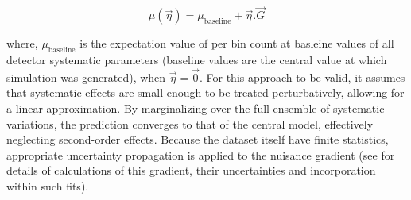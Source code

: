 \begin{equation}\label{eq:gradient}
    \mu(\vec{\eta})  = \mu_{\mathrm{baseline}} + \vec{\eta}.\vec{G}
\end{equation}

where, $\mu_{\mathrm{baseline}}$ is the expectation value of per bin count at basleine values of all detector systematic parameters (baseline values are the central value at which simulation was generated), when $\vec{\eta}=\vec{0}$. For this approach to be valid, it assumes that systematic effects are small enough to be treated perturbatively, allowing for a linear approximation. By marginalizing over the full ensemble of systematic variations, the prediction converges to that of the central model, effectively neglecting second-order effects. Because the dataset itself have finite statistics, appropriate uncertainty propagation is applied to the nuisance gradient (see  for details of calculations of this gradient, their uncertainties and incorporation within such fits). 

